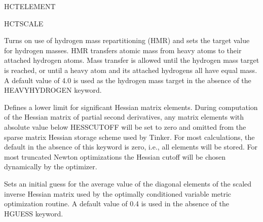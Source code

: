 \documentclass[letterpaper,11pt,english]{sphinxmanual}
\begin{document}
\ignorespaces {}\label{\detokenize{text/keywords:key-hct-element}}
\sphinxAtStartPar
HCT\sphinxhyphen{}ELEMENT

\ignorespaces {}\label{\detokenize{text/keywords:key-hct-scale}}
\sphinxAtStartPar
HCT\sphinxhyphen{}SCALE

\ignorespaces {}\label{\detokenize{text/keywords:key-heavy-hydrogen}}\begin{description}
\sphinxAtStartPar
Turns on use of hydrogen mass repartitioning (HMR) and sets the target value for hydrogen masses. HMR transfers atomic mass from heavy atoms to their attached hydrogen atoms. Mass transfer is allowed until the hydrogen mass target is reached, or until a heavy atom and its attached hydrogens all have equal mass. A default value of 4.0 is used as the hydrogen mass target in the absence of the HEAVY\sphinxhyphen{}HYDROGEN keyword.

\end{description}

\ignorespaces {}\label{\detokenize{text/keywords:key-hessian-cutoff}}\begin{description}
\sphinxAtStartPar
Defines a lower limit for significant Hessian matrix elements. During computation of the Hessian matrix of partial second derivatives, any matrix elements with absolute value below HESS\sphinxhyphen{}CUTOFF will be set to zero and omitted from the sparse matrix Hessian storage scheme used by Tinker. For most calculations, the default in the absence of this keyword is zero, i.e., all elements will be stored. For most truncated Newton optimizations the Hessian cutoff will be chosen dynamically by the optimizer.

\end{description}

\ignorespaces {}\label{\detokenize{text/keywords:key-hguess}}\begin{description}
\sphinxAtStartPar
Sets an initial guess for the average value of the diagonal elements of the scaled inverse Hessian matrix used by the optimally conditioned variable metric optimization routine. A default value of 0.4 is used in the absence of the HGUESS keyword.

\end{description}
\end{document}
